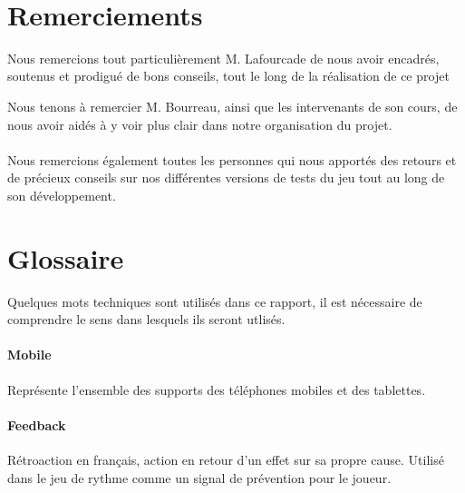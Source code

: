 \documentclass [a4 paper,11pt]{report}
\begin{document}
\newcommand{\HRule}{\rule{\linewidth}{0.5mm}}

\pagestyle{fancy}
\renewcommand\headrulewidth{1pt}
\fancyhead[L]{}
\fancyhead[R]{\leftmark}



\newpage 
~
\thispagestyle{empty}

\newpage

\thispagestyle{empty}
\section*{Remerciements}

Nous remercions tout particulièrement M. Lafourcade de nous avoir encadrés, soutenus et prodigué de bons conseils, tout le long de la réalisation de ce projet

Nous tenons à remercier M. Bourreau, ainsi que les intervenants de son cours, de nous avoir aidés à y voir plus clair dans notre organisation du projet.

\paragraph{}
Nous remercions également toutes les personnes qui nous apportés des retours et de précieux conseils sur nos différentes versions de tests du jeu tout au long de son développement.


\newpage

\setcounter{page}{1}
\tableofcontents

\newpage

\listoffigures

\newpage 



\newpage

\section*{Glossaire}

Quelques mots techniques sont utilisés dans ce rapport, il est nécessaire de comprendre le sens dans lesquels ils seront utlisés.

\paragraph{Mobile} Représente l'ensemble des supports des téléphones mobiles et des tablettes.

\paragraph{Feedback} Rétroaction en français, action en retour d’un effet sur sa propre cause. Utilisé dans le jeu de rythme comme un signal de prévention pour le joueur.
\end{document}
